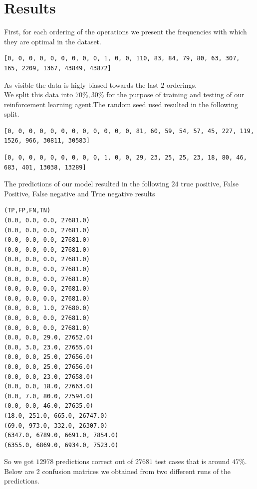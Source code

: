 \section{Results}
First, for each ordering of the operations we present the frequencies with which they are optimal in the dataset.
\begin{lstlisting}[caption=Frequencies of optimal moves in total data]
[0, 0, 0, 0, 0, 0, 0, 0, 0, 1, 0, 0, 110, 83, 84, 79, 80, 63, 307, 165, 2209, 1367, 43849, 43872]
\end{lstlisting} 
As visible the data is higly biased towards the last $2$ orderings.\\
We split this data into $70\%,30\%$ for the purpose of training and testing of our reinforcement learning agent.The random seed used resulted in the following split.
\begin{lstlisting}[caption= Frequencies of optimal move in training data]
[0, 0, 0, 0, 0, 0, 0, 0, 0, 0, 0, 0, 81, 60, 59, 54, 57, 45, 227, 119, 1526, 966, 30811, 30583]
\end{lstlisting}
\begin{lstlisting}[caption= Frequencies of optimal move in testing data]
[0, 0, 0, 0, 0, 0, 0, 0, 0, 1, 0, 0, 29, 23, 25, 25, 23, 18, 80, 46, 683, 401, 13038, 13289]
\end{lstlisting}
The predictions of our model resulted in the following $24$ true positive, False Positive, False negative and True negative results\\
\begin{lstlisting}[caption= True positives False positives False negatives True negatives]
(TP,FP,FN,TN)
(0.0, 0.0, 0.0, 27681.0)
(0.0, 0.0, 0.0, 27681.0)
(0.0, 0.0, 0.0, 27681.0)
(0.0, 0.0, 0.0, 27681.0)
(0.0, 0.0, 0.0, 27681.0)
(0.0, 0.0, 0.0, 27681.0)
(0.0, 0.0, 0.0, 27681.0)
(0.0, 0.0, 0.0, 27681.0)
(0.0, 0.0, 0.0, 27681.0)
(0.0, 0.0, 1.0, 27680.0)
(0.0, 0.0, 0.0, 27681.0)
(0.0, 0.0, 0.0, 27681.0)
(0.0, 0.0, 29.0, 27652.0)
(0.0, 3.0, 23.0, 27655.0)
(0.0, 0.0, 25.0, 27656.0)
(0.0, 0.0, 25.0, 27656.0)
(0.0, 0.0, 23.0, 27658.0)
(0.0, 0.0, 18.0, 27663.0)
(0.0, 7.0, 80.0, 27594.0)
(0.0, 0.0, 46.0, 27635.0)
(18.0, 251.0, 665.0, 26747.0)
(69.0, 973.0, 332.0, 26307.0)
(6347.0, 6789.0, 6691.0, 7854.0)
(6355.0, 6869.0, 6934.0, 7523.0)
\end{lstlisting}
So we got $12978$ predictions correct out of $27681$ test cases that is around $47\%$.
Below are 2 confusion matrices we obtained from two different runs of the predictions.\\

